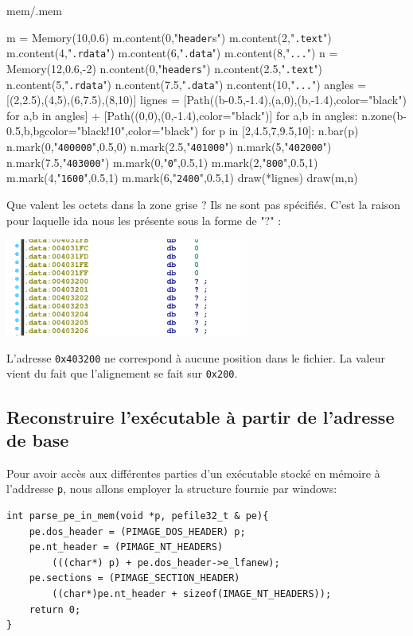 \documentclass{book}
\newcounter{Qcours}
\newenvironment{memory}{%
	\noindent
	\VerbatimEnvironment\stepcounter{Qcours}%
	\begin{VerbatimOut}{mem/\theQcours.mem}%
	}{\end{VerbatimOut}%
}
\newcommand{\code}[1]{\texttt{#1}}
\newcommand{\Windows}{{\sc windows}}
\begin{document}
\bigskip
\begin{memory}
m = Memory(10,0.6)
m.content(0,"\code{header}s")
m.content(2,"\code{.text}")
m.content(4,"\code{.rdata}")
m.content(6,"\code{.data}")
m.content(8,"\code{...}")
n = Memory(12,0.6,-2)
n.content(0,"\code{headers}")
n.content(2.5,"\code{.text}")
n.content(5,"\code{.rdata}")
n.content(7.5,"\code{.data}")
n.content(10,"\code{...}")	
angles = [(2,2.5),(4,5),(6,7.5),(8,10)]
lignes = [Path((b-0.5,-1.4),(a,0),(b,-1.4),color="black") for a,b in angles] + [Path((0,0),(0,-1.4),color="black")]
for a,b in angles:
	n.zone(b-0.5,b,bgcolor="black!10",color="black")
for p in [2,4.5,7,9.5,10]:
	n.bar(p)
n.mark(0,"\code{400000}",0.5,0)
n.mark(2.5,"\code{401000}")
n.mark(5,"\code{402000}")
n.mark(7.5,"\code{403000}")
m.mark(0,"\code{0}",0.5,1)
m.mark(2,"\code{800}",0.5,1)
m.mark(4,"\code{1600}",0.5,1)
m.mark(6,"\code{2400}",0.5,1)
draw(*lignes)
draw(m,n)
\end{memory}

Que valent les octets dans la zone grise ? Ils ne sont pas spécifiés. C'est la raison pour laquelle {\sc ida} nous les présente sous la forme de "?" : 

\includegraphics[width=8cm]{img/ida_zone_non_specifiee.png} 

L'adresse \code{0x403200} ne correspond à aucune position dans le fichier. La valeur vient du fait que l'alignement se fait sur \code{0x200}. 


\subsection{Reconstruire l'exécutable à partir de l'adresse de base}

Pour avoir accès aux différentes parties d'un exécutable stocké en mémoire à l'addresse \code{p},  nous allons employer la structure fournie par \Windows: 
\begin{verbatim}
int parse_pe_in_mem(void *p, pefile32_t & pe){
	pe.dos_header = (PIMAGE_DOS_HEADER) p;
	pe.nt_header = (PIMAGE_NT_HEADERS) 
		(((char*) p) + pe.dos_header->e_lfanew);
	pe.sections = (PIMAGE_SECTION_HEADER) 
		((char*)pe.nt_header + sizeof(IMAGE_NT_HEADERS));
	return 0;
}
\end{verbatim}
\end{document}
